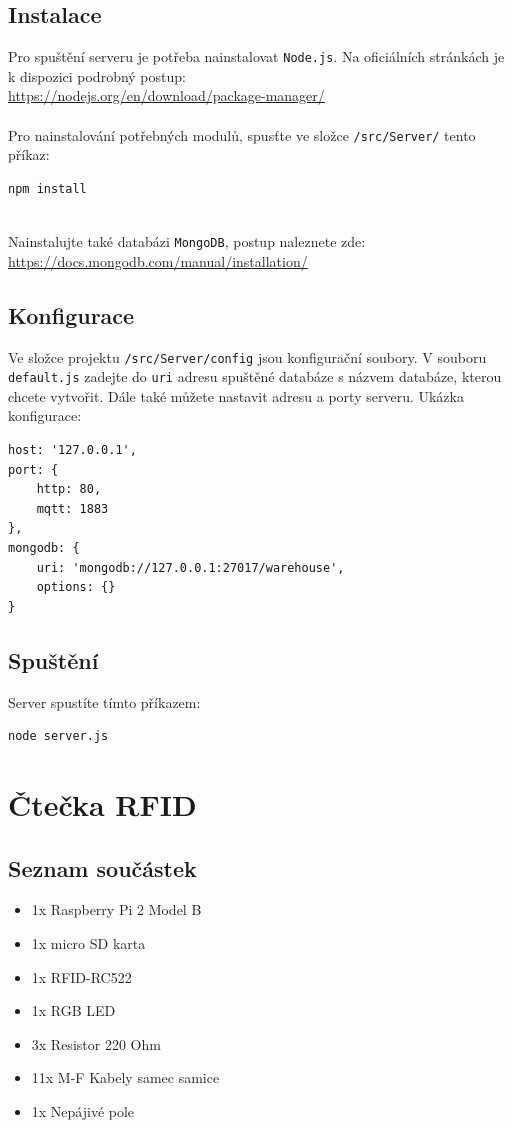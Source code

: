 \documentclass[czech,BP]{thesiskiv}
\begin{document}
\subsection{Instalace}
Pro spuštění serveru je potřeba nainstalovat \texttt{Node.js}. Na oficiálních stránkách je k dispozici podrobný postup: \\
\url{https://nodejs.org/en/download/package-manager/}
\\\\
Pro nainstalování potřebných modulů, spusťte ve složce \texttt{/src/Server/} tento příkaz:
\begin{verbatim}
npm install
\end{verbatim}
\ \\
Nainstalujte také databázi \texttt{MongoDB}, postup naleznete zde: \\
\url{https://docs.mongodb.com/manual/installation/}

\subsection{Konfigurace}
Ve složce projektu \texttt{/src/Server/config} jsou konfigurační soubory. 
V souboru \texttt{default.js} zadejte do \texttt{uri} adresu spuštěné databáze s názvem databáze, kterou chcete vytvořit.
Dále také můžete nastavit adresu a porty serveru. Ukázka konfigurace:
\begin{verbatim}
host: '127.0.0.1',
port: {
    http: 80,
    mqtt: 1883
},
mongodb: {
    uri: 'mongodb://127.0.0.1:27017/warehouse',
    options: {}
}
\end{verbatim}



\subsection{Spuštění}
Server spustíte tímto příkazem:
\begin{verbatim}
node server.js
\end{verbatim}


\section{Čtečka RFID}
	
\subsection{Seznam součástek}
\begin{itemize}
\item 1x Raspberry Pi 2 Model B
\item 1x micro SD karta 
\item 1x RFID-RC522 
\item 1x RGB LED  
\item 3x Resistor 220 Ohm 
\item 11x M-F Kabely samec samice
\item 1x Nepájivé pole
\end{itemize}
\end{document}

